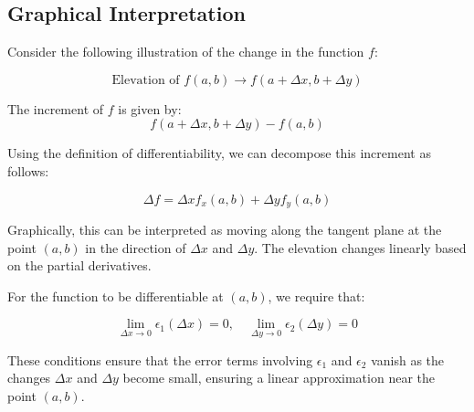 \documentclass{report}
\begin{document}

\subsection*{Graphical Interpretation}

Consider the following illustration of the change in the function $f$:

\[
	\text{Elevation of } f(a, b) \to f(a + \Delta x, b + \Delta y)
\]

The increment of $f$ is given by:
\[
	f(a + \Delta x, b + \Delta y) - f(a, b)
\]

Using the definition of differentiability, we can decompose this increment as follows:

\[
	\Delta f = \Delta x f_x(a, b) + \Delta y f_y(a, b)
\]

Graphically, this can be interpreted as moving along the tangent plane at the point $(a, b)$ in the direction of $\Delta x$ and $\Delta y$. The elevation changes linearly based on the partial derivatives.

For the function to be differentiable at $(a, b)$, we require that:

\[
	\lim_{\Delta x \to 0} \epsilon_1(\Delta x) = 0, \quad \lim_{\Delta y \to 0} \epsilon_2(\Delta y) = 0
\]

These conditions ensure that the error terms involving $\epsilon_1$ and $\epsilon_2$ vanish as the changes $\Delta x$ and $\Delta y$ become small, ensuring a linear approximation near the point $(a, b)$.
\end{document}
